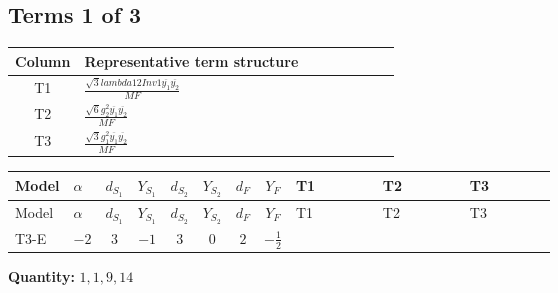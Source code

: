 \documentclass[8pt]{article}
\begin{document}
\begin{landscape}
\subsection*{Terms 1 of 3}
\begin{center}
\begin{tabular}{@{}c >{\raggedright\arraybackslash}p{0.82\linewidth}@{}}
\toprule
Column & Representative term structure \\
\midrule
T1 & \(\displaystyle \frac{\sqrt{3} lambda12Inv1 \overline{y_{1}} \overline{y_{2}}}{MF}\) \\
\midrule
T2 & \(\displaystyle \frac{\sqrt{6} g_{2}^{2} \overline{y_{1}} \overline{y_{2}}}{MF}\) \\
\midrule
T3 & \(\displaystyle \frac{\sqrt{3} g_{1}^{2} \overline{y_{1}} \overline{y_{2}}}{MF}\) \\
\midrule
\bottomrule
\end{tabular}
\end{center}
\smallskip
\tiny
\begin{longtable}{@{}llcccccc >{\raggedright\arraybackslash}p{0.21\linewidth} >{\raggedright\arraybackslash}p{0.21\linewidth} >{\raggedright\arraybackslash}p{0.21\linewidth}@{}}
\toprule
Model & $\alpha$ & $d_{S_1}$ & $Y_{S_1}$ & $d_{S_2}$ & $Y_{S_2}$ & $d_F$ & $Y_F$ & T1 & T2 & T3 \\
\midrule
\endfirsthead
\toprule
Model & $\alpha$ & $d_{S_1}$ & $Y_{S_1}$ & $d_{S_2}$ & $Y_{S_2}$ & $d_F$ & $Y_F$ & T1 & T2 & T3 \\
\midrule
\endhead
T3-E & $-2$ & $3$ & $-1$ & $3$ & $0$ & $2$ & $-\frac{1}{2}$ & \scriptsize\adjustbox{max width=\linewidth}{$\begin{gathered} - \frac{\sqrt{3} lambda12Inv1 \overline{y_{1}} \overline{y_{2}}}{6 MF}\end{gathered}$} & \scriptsize\adjustbox{max width=\linewidth}{$\begin{gathered} \frac{\sqrt{6} g_{2}^{2} \overline{y_{1}} \overline{y_{2}}}{3 MF}\end{gathered}$} & \scriptsize\adjustbox{max width=\linewidth}{$\begin{gathered} \frac{\sqrt{3} g_{1}^{2} \overline{y_{1}} \overline{y_{2}}}{8 MF}\end{gathered}$} \\
\midrule
\bottomrule
\end{longtable}
\clearpage
\noindent\textbf{Quantity: }$\mathrm{1,1,9,14}$\par\smallskip

\end{landscape}
\end{document}
